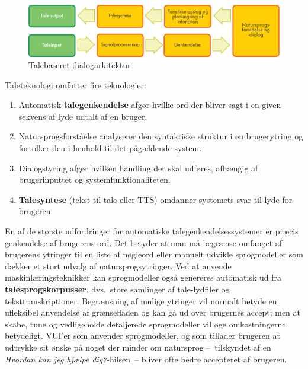 \begin{multicols}{2}
\begin{figure}[htb]
  \center 
  \includegraphics[width=\textwidth]{../_media/danish/simple_speech-based_dialogue_architecture}
  \caption{Talebaseret dialogarkitektur}
  \label{fig:dialoguearch_de}
\end{figure}

Taleteknologi omfatter fire teknologier:

\begin{enumerate}
  \item Automatisk {\bf talegenkendelse} afg\o r hvilke ord der bliver sagt i en given sekvens af lyde udtalt af en bruger.
      \item Natursprogsforst\aa else analyserer den syntaktiske struktur i en brugerytring og fortolker den i henhold til det p\aa g\ae ldende system.
      \item  Dialogstyring afg\o r hvilken handling der skal udf\o res, afh\ae ngig af brugerinputtet og systemfunktionaliteten.
      \item {\bf Talesyntese} (tekst til tale eller TTS) omdanner systemets svar til lyde for brugeren.
\end{enumerate}

  En af de st\o rste udfordringer for automatiske talegenkendelsessystemer er pr\ae cis genkendelse af brugerens ord. Det betyder at man \mbox{m\aa} begr\ae nse omfanget af brugerens ytringer til en liste af n\o gleord eller manuelt udvikle sprogmodeller som d\ae kker et stort udvalg af natursprogsytringer. Ved at anvende maskinl\ae ringsteknikker kan sprogmodeller \mbox{ogs\aa} genereres automatisk ud fra {\bf talesprogskorpusser}, dvs.\ store samlinger af tale-lydfiler og teksttranskriptioner. Begr\ae nsning af mulige ytringer vil normalt betyde en ufleksibel anvendelse af gr\ae nsefladen og kan \mbox{g\aa} ud over brugernes accept; men at skabe, tune og vedligeholde detaljerede sprogmodeller vil \o ge omkostningerne betydeligt. VUI'er som anvender sprogmodeller, og som tillader brugeren at udtrykke sit \o nske \mbox{p\aa} noget der minder om natursprog --~tilskyndet af en {\it Hvordan kan jeg hj\ae lpe dig?}-hilsen~-- bliver ofte bedre accepteret af brugeren.


\end{multicols}
